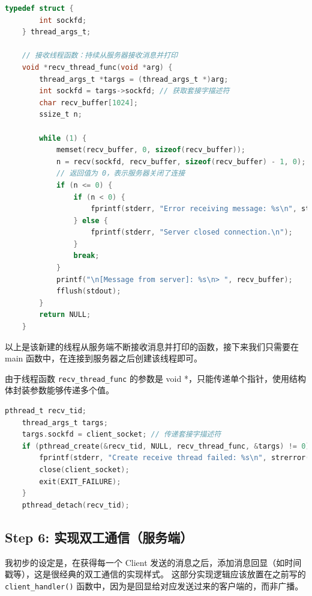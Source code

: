 \documentclass[14pt,a4paper,UTF8,twoside]{article}
\begin{document}
\begin{lstlisting}[language=C, title={Client Duplex}]
    typedef struct {
        int sockfd;
    } thread_args_t;
    
    // 接收线程函数：持续从服务器接收消息并打印
    void *recv_thread_func(void *arg) {
        thread_args_t *targs = (thread_args_t *)arg;
        int sockfd = targs->sockfd; // 获取套接字描述符
        char recv_buffer[1024];
        ssize_t n;
    
        while (1) {
            memset(recv_buffer, 0, sizeof(recv_buffer));
            n = recv(sockfd, recv_buffer, sizeof(recv_buffer) - 1, 0); // 0 表示阻塞接收模式
            // 返回值为 0，表示服务器关闭了连接
            if (n <= 0) {
                if (n < 0) {
                    fprintf(stderr, "Error receiving message: %s\n", strerror(errno));
                } else {
                    fprintf(stderr, "Server closed connection.\n");
                }
                break;
            }
            printf("\n[Message from server]: %s\n> ", recv_buffer);
            fflush(stdout);
        }
        return NULL;
    }
\end{lstlisting}

以上是该新建的线程从服务端不断接收消息并打印的函数，接下来我们只需要在 main 函数中，在连接到服务器之后创建该线程即可。

由于线程函数 \texttt{recv\_thread\_func} 的参数是 void *，只能传递单个指针，使用结构体封装参数能够传递多个值。

\begin{lstlisting}[language=C, title={Client Duplex}]
    pthread_t recv_tid;
    thread_args_t targs;
    targs.sockfd = client_socket; // 传递套接字描述符
    if (pthread_create(&recv_tid, NULL, recv_thread_func, &targs) != 0) {
        fprintf(stderr, "Create receive thread failed: %s\n", strerror(errno));
        close(client_socket);
        exit(EXIT_FAILURE);
    }
    pthread_detach(recv_tid);
\end{lstlisting}

\subsection{Step 6: 实现双工通信（服务端）}

我初步的设定是，在获得每一个 Client 发送的消息之后，添加消息回显（如时间戳等），这是很经典的双工通信的实现样式。
这部分实现逻辑应该放置在之前写的 \texttt{client\_handler()} 函数中，因为是回显给对应发送过来的客户端的，而非广播。
\end{document}
